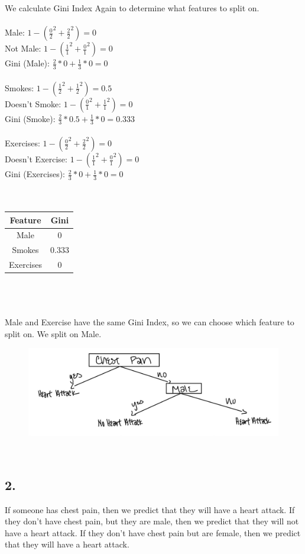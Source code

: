 \documentclass[12pt, letterpaper]{article}
\begin{document}
We calculate Gini Index Again to determine what features to split on.\\\\
Male: $1-(\frac{0}{2}^2+\frac{2}{2}^2) = 0$\\
Not Male: $1-(\frac{1}{1}^2+\frac{0}{1}^2) = 0$\\
Gini (Male): $\frac{2}{3}*0 + \frac{1}{3}*0 = 0$\\\\
Smokes: $1-(\frac{1}{2}^2+\frac{1}{2}^2) = 0.5$\\
Doesn't Smoke: $1-(\frac{0}{1}^2+\frac{1}{1}^2) = 0$\\
Gini (Smoke): $\frac{2}{3}*0.5 + \frac{1}{3}*0 = 0.333$\\\\
Exercises: $1-(\frac{0}{2}^2+\frac{2}{2}^2) = 0$\\
Doesn't Exercise: $1-(\frac{1}{1}^2+\frac{0}{1}^2) = 0$\\
Gini (Exercises): $\frac{2}{3}*0 + \frac{1}{3}*0 = 0$\\\\
\\
\begin{tabular}{ |c|c| } 
 \hline
 \textbf{Feature} & \textbf{Gini} \\ 
\hline
Male & 0 \\ 
\hline
Smokes & 0.333 \\ 
 \hline
Exercises & 0 \\ 
 \hline
\end{tabular}\\\\
\\
Male and Exercise have the same Gini Index, so we can choose which feature to split on. We split on Male.\\
\begin{figure}[h!]
  \includegraphics[scale=0.3]{./images/3.1_two}
\end{figure} \\

\subsection*{2.} If someone has chest pain, then we predict that they will have a heart attack. If they don't have chest pain, but they are male, then we predict that they will not have a heart attack. If they don't have chest pain but are female, then we predict that they will have a heart attack.
\end{document}
